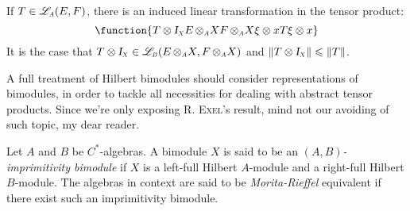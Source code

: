 If $T\in \sub\adj{A}(E,F)$, there is an induced linear transformation in the tensor product:
\begin{equation*}
	\function{{T\otimes \sub\Id X}{E\,\sub\otimes A X}{F\,\sub\otimes A X}{\xi\otimes x}{T\xi\otimes x}}
\end{equation*}
It is the case that $T\otimes \sub\Id X \in \sub\adj{B}(E\,\sub\otimes A X, F\,\sub\otimes A X)$ and $\|T\otimes \sub\Id X\| \leqslant \|T\|$.

A full treatment of Hilbert bimodules should consider representations of bimodules, in order to tackle all necessities for dealing with abstract tensor products. Since we're only exposing \textsc{R. Exel}'s result, mind not our avoiding of such topic, my dear reader.

\begin{definicao}
	Let $A$ and $B$ be $C^*$-algebras. A bimodule $X$ is said to be an \textit{$(A,B)$-imprimitivity bimodule} if $X$ is a left-full Hilbert $A$-module and a right-full Hilbert $B$-module. The algebras in context are said to be \textit{Morita-Rieffel} equivalent if there exist such an imprimitivity bimodule.
\end{definicao}

